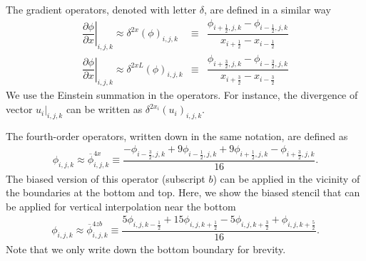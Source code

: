\documentclass[gmd,manuscript]{copernicus}
\begin{document}
The gradient operators, denoted with letter $\delta$, are defined in a similar way
\begin{eqnarray}
\left. \dfrac{\partial \phi}{\partial x}\right|_{i,j,k} \approx \delta^{2x} \left( \phi \right)_{i,j,k} & \equiv & \dfrac{\phi_{i+\frac{1}{2},j,k} - \phi_{i-\frac{1}{2},j,k}}
                                                                                                                 {   x_{i+\frac{1}{2}}   -    x_{i-\frac{1}{2}  }} \\
\left. \dfrac{\partial \phi}{\partial x}\right|_{i,j,k} \approx \delta^{2xL} \left( \phi \right)_{i,j,k}& \equiv & \dfrac{\phi_{i+\frac{3}{2},j,k} - \phi_{i-\frac{3}{2},j,k}}
                                                                                                                  {   x_{i+\frac{3}{2}}   -    x_{i-\frac{3}{2}  }}
\end{eqnarray}
We use the Einstein summation in the operators. For instance, the divergence of vector $\left.u_i\right|_{i,j,k}$ can be written as $\delta^{2x_i}\left( u_i \right)_{i,j,k}$.
% 

The fourth-order operators, written down in the same notation, are defined as
\begin{eqnarray}
\phi_{i,j,k} \approx \overline{\phi}^{4x}_{i,j,k} \equiv \dfrac{- \phi_{i-\frac{3}{2},j,k} + 9 \phi_{i-\frac{1}{2},j,k} + 9 \phi_{i+\frac{1}{2},j,k} - \phi_{i+\frac{3}{2},j,k}}{16}.\label{eq:interp4}
\end{eqnarray}
The biased version of this operator (subscript $b$) can be applied in the vicinity of the boundaries at the bottom and top. Here, we show the biased stencil that can be applied for vertical interpolation near the bottom
\begin{eqnarray}
\phi_{i,j,k} \approx \overline{\phi}^{4zb}_{i,j,k} \equiv \dfrac{ 5 \phi_{i,j,k-\frac{1}{2}} + 15 \phi_{i,j,k+\frac{1}{2}} - 5 \phi_{i,j,k+\frac{3}{2}} + \phi_{i,j,k+\frac{5}{2}}}{16}.
\end{eqnarray}
Note that we only write down the bottom boundary for brevity.
\end{document}

